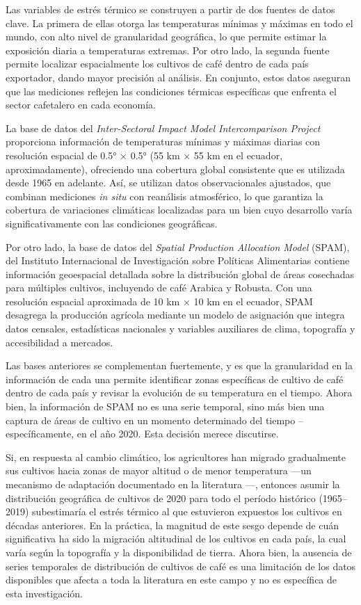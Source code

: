 Las variables de estrés térmico se construyen a partir de dos fuentes de datos clave. La primera de ellas otorga las temperaturas mínimas y máximas en todo el mundo, con alto nivel de granularidad geográfica, lo que permite estimar la exposición diaria a temperaturas extremas. Por otro lado, la segunda fuente permite localizar espacialmente los cultivos de café dentro de cada país exportador, dando mayor precisión al análisis. En conjunto, estos datos aseguran que las mediciones reflejen las condiciones térmicas específicas que enfrenta el sector cafetalero en cada economía.

La base de datos del \textit{Inter-Sectoral Impact Model Intercomparison Project} \citep{isimip2024} proporciona información de temperaturas mínimas y máximas diarias con resolución espacial de 0.5° × 0.5° (55 km × 55 km en el ecuador, aproximadamente), ofreciendo una cobertura global consistente que es utilizada desde 1965 en adelante. Así, se utilizan datos observacionales ajustados, que combinan mediciones \textit{in situ} con reanálisis atmosférico, lo que garantiza la cobertura de variaciones climáticas localizadas para un bien cuyo desarrollo varía significativamente con las condiciones geográficas.

Por otro lado, la base de datos del \textit{Spatial Production Allocation Model} (SPAM), del Instituto Internacional de Investigación sobre Políticas Alimentarias \citep{mapspam_2020} contiene información geoespacial detallada sobre la distribución global de áreas cosechadas para múltiples cultivos, incluyendo de café Arabica y Robusta. Con una resolución espacial aproximada de 10 km × 10 km en el ecuador, SPAM desagrega la producción agrícola mediante un modelo de asignación que integra datos censales, estadísticas nacionales y variables auxiliares de clima, topografía y accesibilidad a mercados.

Las bases anteriores se complementan fuertemente, y es que la granularidad en la información de cada una permite identificar zonas específicas de cultivo de café dentro de cada país y revisar la evolución de su temperatura en el tiempo. Ahora bien, la información de SPAM no es una serie temporal, sino más bien una captura de áreas de cultivo en un momento determinado del tiempo --específicamente, en el año 2020. Esta decisión merece discutirse. 

Si, en respuesta al cambio climático, los agricultores han migrado gradualmente sus cultivos hacia zonas de mayor altitud o de menor temperatura ---un mecanismo de adaptación documentado en la literatura \citep{figari2025climate, burke2016adaptation}---, entonces asumir la distribución geográfica de cultivos de 2020 para todo el período histórico (1965--2019) subestimaría el estrés térmico al que estuvieron expuestos los cultivos en décadas anteriores. En la práctica, la magnitud de este sesgo depende de cuán significativa ha sido la migración altitudinal de los cultivos en cada país, la cual varía según la topografía y la disponibilidad de tierra. Ahora bien, la ausencia de series temporales de distribución de cultivos de café es una limitación de los datos disponibles que afecta a toda la literatura en este campo y no es específica de esta investigación.

